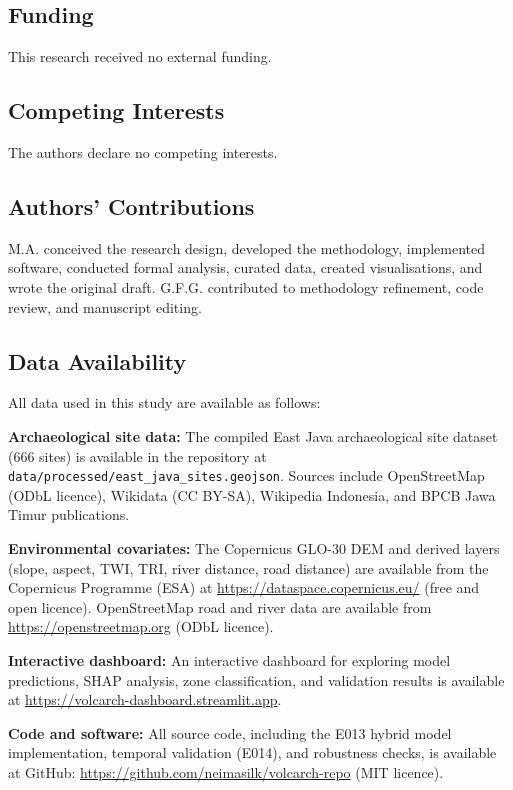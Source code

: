 \documentclass[12pt]{article}
\begin{document}
\subsection*{Funding}

This research received no external funding.

\subsection*{Competing Interests}

The authors declare no competing interests.

\subsection*{Authors' Contributions}

M.A. conceived the research design, developed the methodology, implemented software, conducted formal analysis, curated data, created visualisations, and wrote the original draft.
G.F.G. contributed to methodology refinement, code review, and manuscript editing.

\subsection*{Data Availability}

All data used in this study are available as follows:

\textbf{Archaeological site data:} The compiled East Java archaeological site dataset (666 sites) is available in the repository at \texttt{data/processed/east\_java\_sites.geojson}. Sources include OpenStreetMap (ODbL licence), Wikidata (CC BY-SA), Wikipedia Indonesia, and BPCB Jawa Timur publications.

\textbf{Environmental covariates:} The Copernicus GLO-30 DEM and derived layers (slope, aspect, TWI, TRI, river distance, road distance) are available from the Copernicus Programme (ESA) at \url{https://dataspace.copernicus.eu/} (free and open licence). OpenStreetMap road and river data are available from \url{https://openstreetmap.org} (ODbL licence).

\textbf{Interactive dashboard:} An interactive dashboard for exploring model predictions, SHAP analysis, zone classification, and validation results is available at \url{https://volcarch-dashboard.streamlit.app}.

\textbf{Code and software:} All source code, including the E013 hybrid model implementation, temporal validation (E014), and robustness checks, is available at GitHub: \url{https://github.com/neimasilk/volcarch-repo} (MIT licence).
\end{document}
